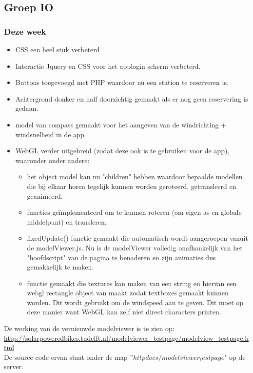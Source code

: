 \subsection*{Groep IO}

\subsubsection*{Deze week}
\begin{itemize}
\item CSS een heel stuk verbeterd
\item Interactie Jquery en CSS voor het applogin scherm verbeterd.
\item Buttons toegevoegd met PHP waardoor nu een station te reserveren is.
\item Achtergrond donker en half doorzichtig gemaakt als er nog geen reservering is gedaan.
\item model van compass gemaakt voor het aangeven van de windrichting + windsnelheid in de app
\item WebGL verder uitgebreid (zodat deze ook is te gebruiken voor de app), waaronder onder andere:
\begin{itemize}
\item het object model kan nu "children" hebben waardoor bepaalde modellen die bij elkaar horen tegelijk kunnen worden geroteerd, getransleerd en geanimeerd.
\item functies ge\"implementeerd om te kunnen roteren (om eigen as en globale middelpunt) en transleren.
\item fixedUpdate() functie gemaakt die automatisch wordt aangeroepen vanuit de modelViewer.js. Nu is de modelViewer volledig onafhankelijk van het "hoofdscript" van de pagina te benaderen en zijn animaties dus gemakkelijk te maken.
\item functie gemaakt die textures kan maken van een string en hiervan een webgl rectangle object van maakt zodat textboxes gemaakt kunnen worden. Dit wordt gebruikt om de windspeed aan te geven. Dit moet op deze manier want WebGL kan zelf niet direct characters printen.
\end{itemize}
\end{itemize}

\noindent De werking van de vernieuwde modelviewer is te zien op:\\ \url{http://solarpoweredbikes.tudelft.nl/modelviewer_testpage/modelview_testpage.html}\\
\noindent De source code ervan staat onder de map ''$httpdocs/modelviewer_testpage$" op de server.\\

